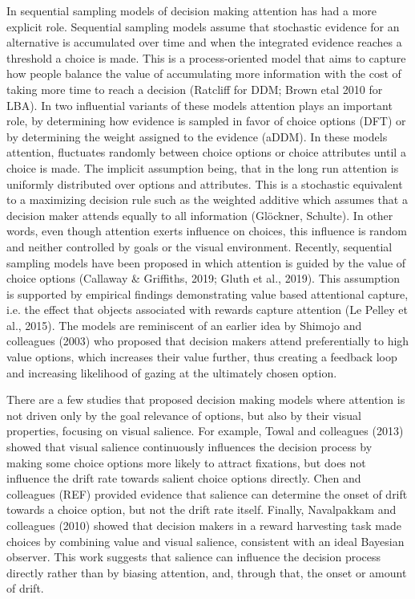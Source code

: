 \documentclass{article}
\begin{document}
In sequential sampling models of decision making attention has had a more explicit role. Sequential sampling models assume that stochastic evidence for an alternative is accumulated over time and when the integrated evidence reaches a threshold a choice is made. This is a process-oriented model that aims to capture how people balance the value of accumulating more information with the cost of taking more time to reach a decision (Ratcliff for DDM; Brown etal 2010 for LBA). In two influential variants of these models attention plays an important role, by determining how evidence is sampled in favor of choice options (DFT) or by determining the weight assigned to the evidence (aDDM). In these models attention, fluctuates randomly between choice options or choice attributes until a choice is made. The implicit assumption being, that in the long run attention is uniformly distributed over options and attributes. This is a stochastic equivalent to a maximizing decision rule such as the weighted additive which assumes that a decision maker attends equally to all information (Glöckner, Schulte). In other words, even though attention exerts influence on choices, this influence is random and neither controlled by goals or the visual environment. Recently, sequential sampling models have been proposed in which attention is guided by the value of choice options (Callaway \& Griffiths, 2019; Gluth et al., 2019). This assumption is supported by empirical findings demonstrating value based attentional capture, i.e. the effect that objects associated with rewards capture attention (Le Pelley et al., 2015). The models are reminiscent of an earlier idea by Shimojo and colleagues (2003) who proposed that decision makers attend preferentially to high value options, which increases their value further, thus creating a feedback loop and increasing likelihood of gazing at the ultimately chosen option. 

There are a few studies that proposed decision making models where attention is not driven only by the goal relevance of options, but also by their visual properties, focusing on visual salience. For example, Towal and colleagues (2013) showed that visual salience continuously influences the decision process by making some choice options more likely to attract fixations, but does not influence the drift rate towards salient choice options directly. Chen and colleagues (REF) provided evidence that salience can determine the onset of drift towards a choice option, but not the drift rate itself. Finally, Navalpakkam and colleagues (2010) showed that decision makers in a reward harvesting task made choices by combining value and visual salience, consistent with an ideal Bayesian observer. This work suggests that salience can influence the decision process directly rather than by biasing attention, and, through that, the onset or amount of drift. 
\end{document}
